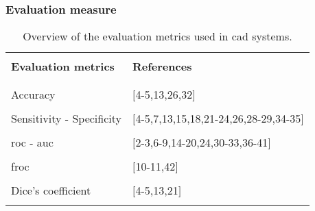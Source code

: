 \subsubsection{Evaluation measure}\label{subsubsec:eval}

\begin{table}
	\caption{Overview of the evaluation metrics used in \ac{cad} systems.}
	\small
	\begin{tabular}{p{.55\linewidth} p{.35\linewidth}}
		\hline \\ [-1.5ex]
		\textbf{Evaluation metrics} & \textbf{References} \\ \\ [-1.5ex]
		\hline \\ [-1.5ex]
		\quad Accuracy & $[$4-5,13,26,32$]$ \\ \\ [-1.5ex]
		\quad Sensitivity - Specificity & $[$4-5,7,13,15,18,21-24,26,28-29,34-35$]$ \\ \\ [-1.5ex]
		\quad \acs{roc} - \acs{auc} & $[$2-3,6-9,14-20,24,30-33,36-41$]$ \\ \\ [-1.5ex]
		\quad \acs{froc} & $[$10-11,42$]$ \\ \\ [-1.5ex]
		\quad Dice's coefficient & $[$4-5,13,21$]$ \\ \\ [-1.5ex]
		\hline
	\end{tabular}
	\label{tab:evatec}
\end{table}

